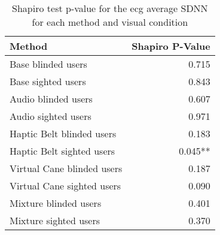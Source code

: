 
\begin{table}[!htb]
\centering
\caption{Shapiro test p-value for the ecg average SDNN for each method and visual condition}
\label{tab:shapiro_ecg_sdnn}
\begin{tabular}{lr}
\toprule
                    Method & Shapiro P-Value \\
\midrule
        Base blinded users &           0.715 \\
        Base sighted users &           0.843 \\
       Audio blinded users &           0.607 \\
       Audio sighted users &           0.971 \\
 Haptic Belt blinded users &           0.183 \\
 Haptic Belt sighted users &         0.045** \\
Virtual Cane blinded users &           0.187 \\
Virtual Cane sighted users &           0.090 \\
     Mixture blinded users &           0.401 \\
     Mixture sighted users &           0.370 \\
\bottomrule
\end{tabular}
\end{table}

